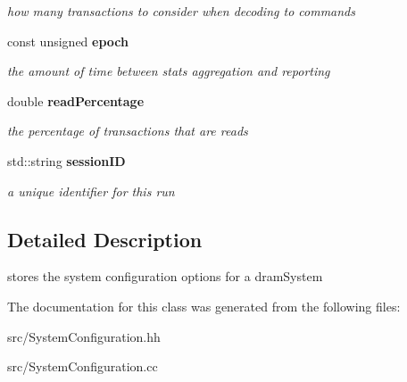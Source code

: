 \begin{DoxyCompactItemize}
\begin{DoxyCompactList}\small\item\em how many transactions to consider when decoding to commands \item\end{DoxyCompactList}\item 
const unsigned {\bf epoch}\label{class_d_r_a_msim_i_i_1_1_system_configuration_a5016c31730e2cd299c3673bc3dac8f22}

\begin{DoxyCompactList}\small\item\em the amount of time between stats aggregation and reporting \item\end{DoxyCompactList}\item 
double {\bf readPercentage}\label{class_d_r_a_msim_i_i_1_1_system_configuration_a7ab7f5c65f2e9221febeb4c9b0c2a9ac}

\begin{DoxyCompactList}\small\item\em the percentage of transactions that are reads \item\end{DoxyCompactList}\item 
std::string {\bf sessionID}\label{class_d_r_a_msim_i_i_1_1_system_configuration_ae184c864eb50362bf6fefdeb70fc9a1c}

\begin{DoxyCompactList}\small\item\em a unique identifier for this run \item\end{DoxyCompactList}\end{DoxyCompactItemize}


\subsection{Detailed Description}
stores the system configuration options for a dramSystem 

The documentation for this class was generated from the following files:\begin{DoxyCompactItemize}
\item 
src/SystemConfiguration.hh\item 
src/SystemConfiguration.cc\end{DoxyCompactItemize}
